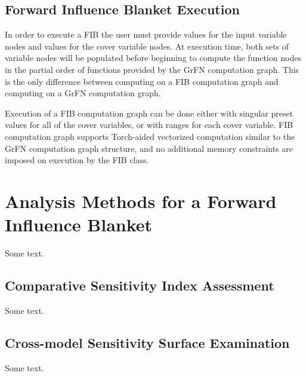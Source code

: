 \subsection{Forward Influence Blanket Execution\label{sec:fib_exec}}
In order to execute a FIB the user must provide values for the input variable nodes and values for the cover variable nodes. At execution time, both sets of variable nodes will be populated before beginning to compute the function nodes in the partial order of functions provided by the GrFN computation graph. This is the only difference between computing on a FIB computation graph and computing on a GrFN computation graph.

Execution of a FIB computation graph can be done either with singular preset values for all of the cover variables, or with ranges for each cover variable. FIB computation graph supports Torch-aided vectorized computation similar to the GrFN computation graph structure, and no additional memory constraints are imposed on execution by the FIB class.

\section{Analysis Methods for a Forward Influence Blanket \label{sec:fib_analysis}}

Some text.

\subsection{Comparative Sensitivity Index Assessment\label{sec:comp_sens_ind}}
Some text.

\subsection{Cross-model Sensitivity Surface Examination \label{sec:multi_mod_surface}}
Some text.
